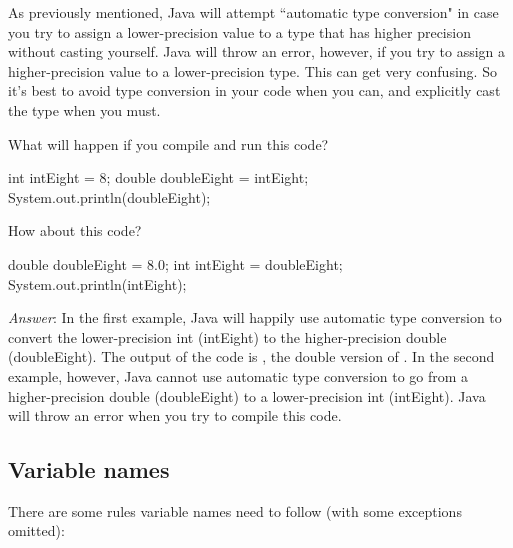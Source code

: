 As previously mentioned, Java will attempt ``automatic type conversion" in case you try to assign a lower-precision value to a type that has higher precision without casting yourself. Java will throw an error, however, if you try to assign a higher-precision value to a lower-precision type. This can get very confusing. So it's best to avoid type conversion in your code when you can, and explicitly cast the type when you must. 

\begin{example}
  What will happen if you compile and run this code? 
  \begin{code}
    int intEight = 8;
   double doubleEight = intEight;
   System.out.println(doubleEight);
  \end{code}
  
  How about this code? 
  \begin{code}
  double doubleEight = 8.0;
  int intEight = doubleEight; 
  System.out.println(intEight);
  \end{code}
  
\noindent \emph{Answer}: In the first example, Java will happily use automatic type conversion to convert the lower-precision int (intEight) to the higher-precision double (doubleEight). The output of the code is , the double version of . In the second example, however, Java cannot use automatic type conversion to go from a higher-precision double (doubleEight) to a lower-precision int (intEight). Java will throw an error when you try to compile this code. 
\end{example}

\subsection{Variable names}

There are some rules variable names need to follow (with some exceptions omitted):

